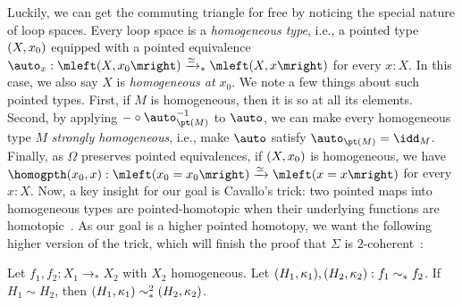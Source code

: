 \documentclass{lmcs}
\theoremstyle{definition}\newtheorem{note}[thm]{Note}
\begin{document}
Luckily, we can get the commuting triangle for free by noticing the special nature of loop spaces. Every loop space is a \emph{homogeneous type}, i.e., a pointed type $\mleft(X, x_0\mright)$ equipped with a pointed equivalence $\auto_x : \mleft(X, x_0\mright) \xrightarrow{\simeq}_{\ast} \mleft(X, x\mright)$ for every $x : X$. In this case, we also say $X$ is \emph{homogeneous at $x_0$}. We note a few things about such pointed types. First, if $M$ is homogeneous, then it is so at all its elements. Second, by applying ${-} \circ \auto_{\pt(M)}^{-1}$ to $\auto$, we can make every homogeneous type $M$ \emph{strongly homogeneous}, i.e., make $\auto$ satisfy $\auto_{\pt(M)} = \idd_M$. Finally, as $\Omega$ preserves pointed equivalences, if $\mleft(X, x_0\mright)$ is homogeneous, we have $\homogpth(x_0, x) : \mleft(x_0 = x_0\mright) \xrightarrow{\simeq} \mleft(x = x\mright)$ for every $x : X$. 
Now, a key insight for our goal is Cavallo's trick: two pointed maps into homogeneous types are pointed-homotopic when their underlying functions are homotopic~\cite[]{cubical}.
As our goal is a higher pointed homotopy, we want the following higher version of the trick, which will finish the proof that $\Sigma$ is $2$-coherent~\cite[]{2cohagda-pub}:
\begin{lem} \label{trick}
  Let $f_1, f_2 : X_1 \to_{\ast} X_2$ with $X_2$ homogeneous. Let $\mleft(H_1, \kappa_1\mright), \mleft(H_2, \kappa_2\mright) : f_1 \sim_{\ast} f_2$. If $H_1 \sim H_2$, then $\mleft(H_1, \kappa_1\mright) \sim_{\ast}^2 \mleft(H_2, \kappa_2\mright)$.
\end{lem}
\end{document}
